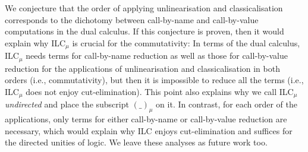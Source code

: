 \documentclass[a4paper]{article}
\theoremstyle{definition}
\theoremstyle{theorem}
\theoremstyle{remark}
\begin{document}
We conjecture that the order of applying unlinearisation and classicalisation corresponds to the dichotomy between call-by-name and call-by-value computations in the dual calculus.
If this conjecture is proven, then it would explain why \textsf{ILC$_\mu$} is crucial for the commutativity: In terms of the dual calculus, \textsf{ILC$_\mu$} needs terms for call-by-name reduction as well as those for call-by-value reduction for the applications of unlinearisation and classicalisation in both orders (i.e., commutativity), but then it is impossible to reduce all the terms (i.e., \textsf{ILC$_\mu$} does not enjoy cut-elimination).
This point also explains why we call \textsf{ILC$_\mu$} \emph{undirected} and place the subscript $(\_)_\mu$ on it.
In contrast, for each order of the applications, only terms for either call-by-name or call-by-value reduction are necessary, which would explain why \textsf{ILC} enjoys cut-elimination and suffices for the directed unities of logic.
We leave these analyses as future work too.
\fi
\end{document}
